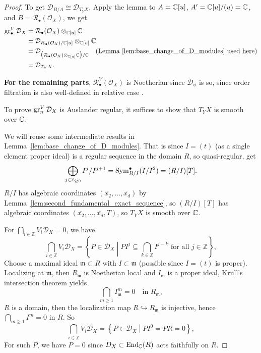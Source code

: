 \begin{proof}
    To get $\mathcal{D}_{B/A} \cong \mathcal{D}_{T_Y X}$.
    Apply the lemma to $A=\mathbb{C}[u]$, $A'=\mathbb{C}[u]/(u)=\mathbb{C}$, and $B=\mathcal{R}_{\bullet}(\mathcal{O}_X)$,
    we get
    \begin{align*}
        \operatorname{gr}^V_{\bullet}\mathcal{D}_X
         & = \mathcal{R}_{\bullet}(\mathcal{O}_X) \otimes_{\mathbb{C}[u]} \mathbb{C}                                                                                               \\
         & = \mathcal{D}_{\mathcal{R}_{\bullet}(\mathcal{O}_X)/\mathbb{C}[u]}\otimes_{\mathbb{C}[u]} \mathbb{C}                                                                            \\
         & = \mathcal{D}_{\bigl(\mathcal{R}_{\bullet}(\mathcal{O}_X) \otimes_{\mathbb{C}[u]} \mathbb{C}\bigr)/\mathbb{C}}\quad (\text{Lemma~\ref{lem:base_change_of_D_modules} used here}) \\
         & = \mathcal{D}_{T_Y X}.
    \end{align*}

    \noindent\textbf{For the remaining parts},
    $\mathcal{R}^V_{\bullet}(\mathcal{O}_X)$ is Noetherian since $\mathcal{D}_{\phi}$ is so, since order filtration is also well-defined in relative case \cite[\href{https://stacks.math.columbia.edu/tag/09CI}{Tag 09CI}]{stacks-project}.

    \medskip

    To prove $\operatorname{gr}^V_n \mathcal{D}_X$ is Auslander regular, it suffices to show that $T_Y X$ is smooth over $\mathbb{C}$.

    We will reuse some intermediate results in Lemma~\ref{lem:base_change_of_D_modules}.
    That is since $I=(t)$ (as a single element proper ideal) is a regular sequence in the domain $R$,
    so quasi-regular, get
    $$\bigoplus\limits_{j \in \mathbb{Z}_{\geq 0}} I^j/I^{j+1} = \operatorname{Sym}^{\bullet}_{R/I}(I/I^2) = (R/I)[T].$$
    $R/I$ has algebraic coordinates $(\overline{x_2},\dots,\overline{x_d})$ by Lemma~\ref{lem:second_fundamental_exact_sequence}, so $(R/I)[T]$ has algebraic coordinates $(\overline{x_2},\dots,\overline{x_d},T)$, so $T_Y X$ is smooth over $\mathbb{C}$.

    \medskip

    For $\bigcap\limits_{i \in \mathbb{Z}} V_i \mathcal{D}_X = 0$, we have
    $$\bigcap\limits_{i \in \mathbb{Z}} V_i \mathcal{D}_X = \left\{P \in \mathcal{D}_X \middle| P I^{j} \subseteq \bigcap\limits_{k \in \mathbb{Z}} I^{j-k}\text{ for all }j\in \mathbb{Z}\right\},$$
    Choose a maximal ideal $\mathfrak m\subset R$ with $I\subset\mathfrak m$ (possible since $I=(t)$ is proper). Localizing at $\mathfrak m$,
    then $R_{\mathfrak m}$ is Noetherian local and $I_{\mathfrak m}$ is a proper ideal, Krull's intersection theorem yields
    \[
        \bigcap_{m\ge 1} I_{\mathfrak m}^m = 0 \quad\text{in }R_{\mathfrak m},
    \]
    $R$ is a domain, then the localization map $R\hookrightarrow R_{\mathfrak m}$ is injective, hence $\bigcap\limits_{m\ge 1} I^m = 0$ in $R$. So
    $$\bigcap\limits_{i \in \mathbb{Z}} V_i \mathcal{D}_X = \left\{P \in \mathcal{D}_X \middle| P I^{0} = P R = 0 \right\},$$
    For such $P$, we have $P=0$ since $D_X\subset \operatorname{End}_{\mathbb{C}}(R)$ acts faithfully on $R$.

\end{proof}


